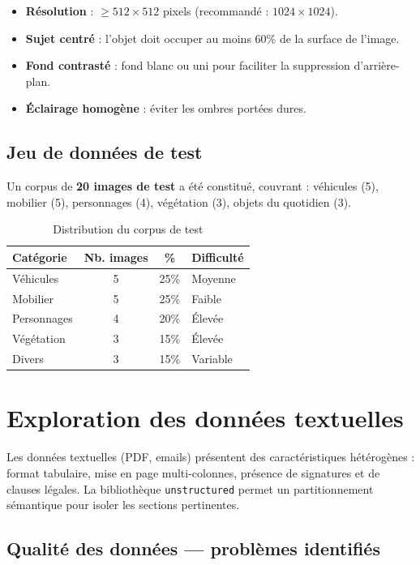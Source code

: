 \documentclass[12pt,a4paper,oneside]{report}
\begin{document}
\begin{itemize}
  \item \textbf{Résolution} : $\geq 512 \times 512$ pixels (recommandé :
        $1024 \times 1024$).
  \item \textbf{Sujet centré} : l'objet doit occuper au moins 60\% de la
        surface de l'image.
  \item \textbf{Fond contrasté} : fond blanc ou uni pour faciliter la
        suppression d'arrière-plan.
  \item \textbf{Éclairage homogène} : éviter les ombres portées dures.
\end{itemize}

\subsection{Jeu de données de test}
Un corpus de \textbf{20 images de test} a été constitué, couvrant :
véhicules (5), mobilier (5), personnages (4), végétation (3), objets
du quotidien (3).

\begin{table}[H]
\centering
\caption{Distribution du corpus de test}
\label{tab:corpus}
\begin{tabular}{@{}lccl@{}}
\toprule
\textbf{Catégorie} & \textbf{Nb. images} & \textbf{\%} & \textbf{Difficulté} \\
\midrule
Véhicules    & 5 & 25\% & Moyenne \\
Mobilier     & 5 & 25\% & Faible \\
Personnages  & 4 & 20\% & Élevée \\
Végétation   & 3 & 15\% & Élevée \\
Divers       & 3 & 15\% & Variable \\
\bottomrule
\end{tabular}
\end{table}

\section{Exploration des données textuelles}

Les données textuelles (PDF, emails) présentent des caractéristiques
hétérogènes : format tabulaire, mise en page multi-colonnes, présence de
signatures et de clauses légales. La bibliothèque \texttt{unstructured}
permet un partitionnement sémantique pour isoler les sections pertinentes.

\subsection{Qualité des données — problèmes identifiés}
\end{document}
